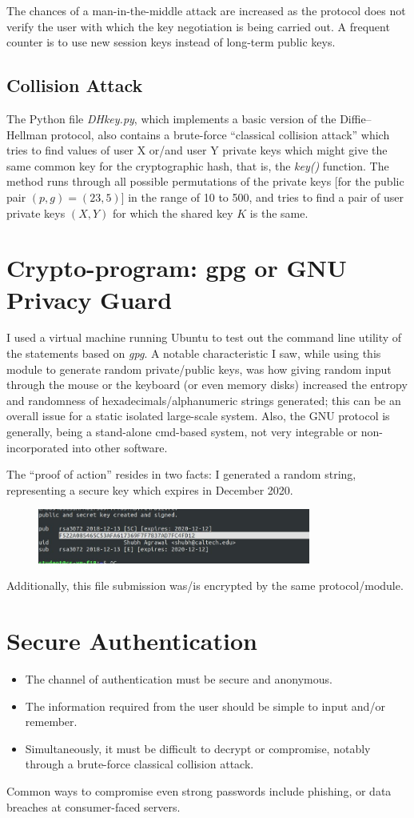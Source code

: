 \documentclass{report}
\begin{document}
The chances of a man-in-the-middle attack are increased as the protocol does not verify the user with which the key negotiation is being carried out. A frequent counter is to use new session keys instead of long-term public keys.
\subsection*{Collision Attack}
The Python file \textit{DHkey.py}, which implements a basic version of the Diffie–Hellman protocol, also contains a brute-force ``classical collision attack'' which tries to find values of user X or/and user Y private keys which might give the same common key for the cryptographic hash, that is, the \textit{key()} function. The method runs through all possible permutations of the private keys [for the public pair $(p, g) = (23, 5)$] in the range of 10 to 500, and tries to find a pair of user private keys $(X, Y)$ for which the shared key $K$ is the same.
\section*{Crypto-program: gpg or GNU Privacy Guard}
I used a virtual machine running Ubuntu to test out the command line utility of the statements based on \textit{gpg}. A notable characteristic I saw, while using this module to generate random private/public keys, was how giving random input through the mouse or the keyboard (or even memory disks) increased the entropy and randomness of hexadecimals/alphanumeric strings generated; this can be an overall issue for a static isolated large-scale system. Also, the GNU protocol is generally, being a stand-alone cmd-based system, not very integrable or non-incorporated into other software.

The ``proof of action'' resides in two facts: I generated a random string, representing a secure key which expires in December 2020.
\begin{figure}[H]
	\centering
	\includegraphics[width = 0.8\textwidth]{KEY.jpg}
	\label{key}
\end{figure}
Additionally, this file submission was/is encrypted by the same protocol/module.
\section*{Secure Authentication}
\begin{itemize}
	\item The channel of authentication must be secure and anonymous.
	\item The information required from the user should be simple to input and/or remember.
	\item Simultaneously, it must be difficult to decrypt or compromise, notably through a brute-force classical collision attack.
\end{itemize}
Common ways to compromise even strong passwords include phishing, or data breaches at consumer-faced servers.
\end{document}
